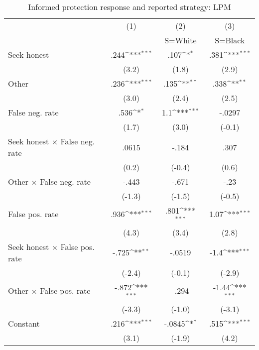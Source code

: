 \begin{table}[htbp]\centering
\def\sym#1{\ifmmode^{#1}\else\(^{#1}\)\fi}
\caption{Informed protection response and reported strategy: LPM}
\begin{tabular}{l*{3}{c}}
\hline\hline
                &\multicolumn{1}{c}{(1)}&\multicolumn{1}{c}{(2)}&\multicolumn{1}{c}{(3)}\\
                &\multicolumn{1}{c}{}&\multicolumn{1}{c}{S=White}&\multicolumn{1}{c}{S=Black}\\
\hline
Seek honest     &     .244\sym{***}&     .107\sym{*}  &     .381\sym{***}\\
                &    (3.2)         &    (1.8)         &    (2.9)         \\
Other           &     .236\sym{***}&     .135\sym{**} &     .338\sym{**} \\
                &    (3.0)         &    (2.4)         &    (2.5)         \\
False neg. rate &     .536\sym{*}  &      1.1\sym{***}&   -.0297         \\
                &    (1.7)         &    (3.0)         &   (-0.1)         \\
Seek honest $\times$ False neg. rate&    .0615         &    -.184         &     .307         \\
                &    (0.2)         &   (-0.4)         &    (0.6)         \\
Other $\times$ False neg. rate&    -.443         &    -.671         &     -.23         \\
                &   (-1.3)         &   (-1.5)         &   (-0.5)         \\
False pos. rate &     .936\sym{***}&     .801\sym{***}&     1.07\sym{***}\\
                &    (4.3)         &    (3.4)         &    (2.8)         \\
Seek honest $\times$ False pos. rate&    -.725\sym{**} &   -.0519         &     -1.4\sym{***}\\
                &   (-2.4)         &   (-0.1)         &   (-2.9)         \\
Other $\times$ False pos. rate&    -.872\sym{***}&    -.294         &    -1.44\sym{***}\\
                &   (-3.3)         &   (-1.0)         &   (-3.1)         \\
Constant        &     .216\sym{***}&   -.0845\sym{*}  &     .515\sym{***}\\
                &    (3.1)         &   (-1.9)         &    (4.2)         \\

\end{tabular}
\end{table}
